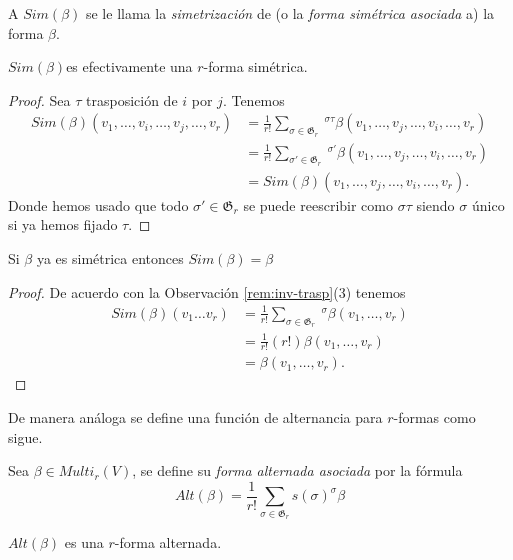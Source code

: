 \documentclass[../VD.tex]{subfiles}
\begin{document}
A \(Sim(\beta)\) se le llama la \emph{simetrización} de (o la \emph{forma simétrica asociada} a) la forma \(\beta\). 

\begin{lemma}
\( Sim(\beta) \)es efectivamente una $r$-forma simétrica.
\end{lemma}

\begin{proof}
Sea \( \tau \) trasposición de \( i \) por \( j \). Tenemos
\begin{align*}
Sim(\beta)(v_1,\ldots, v_i,\ldots, v_j,\ldots, v_r)&=\frac{1}{r!}\sum_{\sigma\in \mathfrak{G}_r} \ ^{\sigma\tau}\beta (v_1,\ldots, v_j,\ldots, v_i,\ldots, v_r)\\
&=\frac{1}{r!}\sum_{\sigma'\in \mathfrak{G}_r} \ ^{\sigma'}\beta(v_1,\ldots, v_j,\ldots, v_i,\ldots, v_r)\\
&=Sim(\beta)(v_1,\ldots, v_j,\ldots, v_i,\ldots, v_r).
\end{align*}
Donde hemos usado que todo \( \sigma'\in \mathfrak{G}_r \) se puede reescribir como \( \sigma \tau \) siendo \( \sigma \) único si ya hemos fijado \( \tau \).
\end{proof}

\begin{lemma}
Si \( \beta \) ya es simétrica entonces \( Sim(\beta)=\beta \)
\end{lemma}

\begin{proof}
De acuerdo con la Observación \ref{rem:inv-trasp}(3) tenemos
\begin{align*}
Sim(\beta)(v_1\ldots v_r)&=\frac{1}{r!}\sum_{\sigma\in \mathfrak{G}_r} \  ^\sigma\beta(v_1,\ldots, v_r)\\
&=\frac{1}{r!}(r!)\beta(v_1,\ldots, v_r)\\
&=\beta(v_1,\ldots, v_r).
\end{align*}
\end{proof}


De manera análoga se define una función de alternancia para \(r\)-formas como sigue.
\begin{definition}
Sea \( \beta\in Multi_r(V) \), se define su \emph{forma alternada asociada} por la fórmula
\[
Alt(\beta)=\frac{1}{r!}\sum_{\sigma\in \mathfrak{G}_r} s(\sigma) ^\sigma\beta
\]
\end{definition}


\begin{lemma}
\( Alt(\beta) \) es una \(r\)-forma alternada.
\end{lemma}
\end{document}
